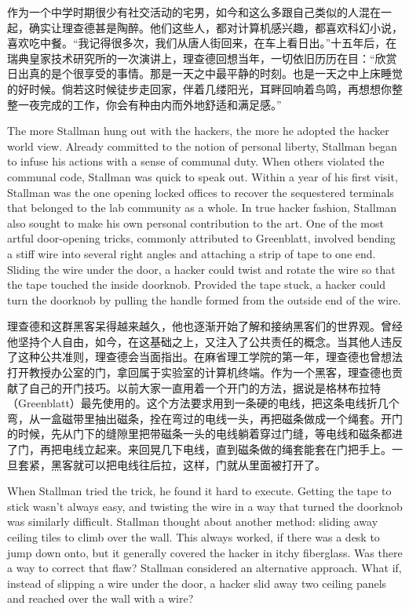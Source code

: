 \ifdefined\chs
作为一个中学时期很少有社交活动的宅男，如今和这么多跟自己类似的人混在一起，确实让理查德甚是陶醉。他们这些人，都对计算机感兴趣，都喜欢科幻小说，喜欢吃中餐。“我记得很多次，我们从唐人街回来，在车上看日出。”十五年后，在瑞典皇家技术研究所的一次演讲上，理查德回想当年，一切依旧历历在目：“欣赏日出真的是个很享受的事情。那是一天之中最平静的时刻。也是一天之中上床睡觉的好时候。倘若这时候徒步走回家，伴着几缕阳光，耳畔回响着鸟鸣，再想想你整整一夜完成的工作，你会有种由内而外地舒适和满足感。”
\fi

\ifdefined\eng
The more Stallman hung out with the hackers, the more he adopted the hacker world view. Already committed to the notion of personal liberty, Stallman began to infuse his actions with a sense of communal duty. When others violated the communal code, Stallman was quick to speak out. Within a year of his first visit, Stallman was the one opening locked offices to recover the sequestered terminals that belonged to the lab community as a whole. In true hacker fashion, Stallman also sought to make his own personal contribution to the art. One of the most artful door-opening tricks, commonly attributed to Greenblatt, involved bending a stiff wire into several right angles and attaching a strip of tape to one end. Sliding the wire under the door, a hacker could twist and rotate the wire so that the tape touched the inside doorknob. Provided the tape stuck, a hacker could turn the doorknob by pulling the handle formed from the outside end of the wire.
\fi

\ifdefined\chs
理查德和这群黑客呆得越来越久，他也逐渐开始了解和接纳黑客们的世界观。曾经他坚持个人自由，如今，在这基础之上，又注入了公共责任的概念。当其他人违反了这种公共准则，理查德会当面指出。在麻省理工学院的第一年，理查德也曾想法打开教授办公室的门，拿回属于实验室的计算机终端。作为一个黑客，理查德也贡献了自己的开门技巧。以前大家一直用着一个开门的方法，据说是格林布拉特（Greenblatt）最先使用的。这个方法要求用到一条硬的电线，把这条电线折几个弯，从一盒磁带里抽出磁条，拴在弯过的电线一头，再把磁条做成一个绳套。开门的时候，先从门下的缝隙里把带磁条一头的电线躺着穿过门缝，等电线和磁条都进了门，再把电线立起来。来回晃几下电线，直到磁条做的绳套能套在门把手上。一旦套紧，黑客就可以把电线往后拉，这样，门就从里面被打开了。
\fi

\ifdefined\eng
When Stallman tried the trick, he found it hard to execute. Getting the tape to stick wasn't always easy, and twisting the wire in a way that turned the doorknob was similarly difficult. Stallman thought about another method: sliding away ceiling tiles to climb over the wall. This always worked, if there was a desk
to jump down onto, but it generally covered the hacker in itchy fiberglass.  Was there a way to correct that flaw?  Stallman considered an alternative approach. What if, instead of slipping a wire under the door, a hacker slid away two ceiling panels and reached over the wall with a wire?
\fi

